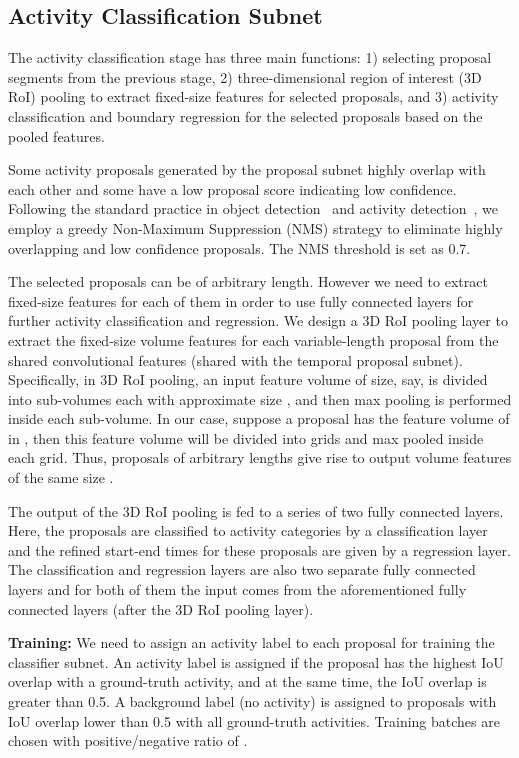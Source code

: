 \documentclass[10pt,twocolumn,letterpaper]{article}
\begin{document}
\subsection{Activity Classification Subnet}
\label{sec:classification}
The activity classification stage has three main functions: 1) selecting proposal segments from the previous stage, 2) three-dimensional region of interest (3D RoI) pooling to extract fixed-size features for selected proposals, and 3) activity classification and boundary regression for the selected proposals based on the pooled features. 

Some activity proposals generated by the proposal subnet highly overlap with each other and some have a low proposal score indicating low confidence.
Following the standard practice in object detection~\cite{Felzenszwalb2010Object, ren2015faster} and activity detection~\cite{shou2016temporal, yeung2016end}, we employ a greedy Non-Maximum Suppression (NMS) strategy to eliminate highly overlapping and low confidence proposals.
The NMS threshold is set as 0.7.

The selected proposals can be of arbitrary length.
However we need to extract fixed-size features for each of them in order to use fully connected layers for further activity classification and regression.
We design a 3D RoI pooling layer to extract the fixed-size volume features for each variable-length proposal from the shared convolutional features  (shared with the temporal proposal subnet).
Specifically, in 3D RoI pooling, an input feature volume of size, say,  is divided into  sub-volumes each with approximate size , and then max pooling is performed inside each sub-volume.
In our case, suppose a proposal has the feature volume of  in , then this feature volume will be divided into  grids and max pooled inside each grid.
Thus, proposals of arbitrary lengths give rise to  output volume features of the same size .

The output of the 3D RoI pooling is fed to a series of two fully connected layers.
Here, the proposals are classified to activity categories by a classification layer and the refined start-end times for these proposals are given by a regression layer.
The classification and regression layers are also two separate fully connected layers and for both of them the input comes from the aforementioned fully connected layers (after the 3D RoI pooling layer).

\noindent\textbf{Training:} We need to assign an activity label to each proposal for training the classifier subnet.
An activity label is assigned if the proposal has the highest IoU overlap with a ground-truth activity, and at the same time, the IoU overlap is greater than 0.5.
A background label (no activity) is assigned to proposals with IoU overlap lower than 0.5 with all ground-truth activities.
Training batches are chosen with positive/negative ratio of .
\end{document}
